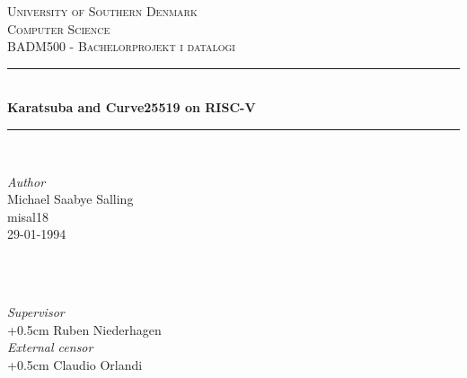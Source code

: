 \documentclass[12pt]{article}
\begin{document}
\setlength{\baselineskip}{1.5\baselineskip} %

\begin{titlepage} %
	\newcommand{\HRule}{\rule{\linewidth}{0.5mm}} %
	
	\center %
	
	
	\textsc{\LARGE University of Southern Denmark}\\[1.5cm] %
	
	\textsc{\Large Computer Science}\\[0.5cm] %
	
	\textsc{\large BADM500 - Bachelorprojekt i datalogi}\\[0.5cm] %
	
	
	\HRule\\[0.7cm]
	
	{\huge\bfseries Karatsuba and Curve25519 on RISC-V }\\[0.3cm] %
	
	\HRule\\[1.5cm]
	
	\begin{minipage}[c]{0.5\textwidth}
		\begin{flushleft}
			\large
			\textit{Author}\\
			[5mm]
			{Michael Saabye Salling \\}
			{misal18}\\
			{29-01-1994}\\
			\textsc{\Large }\\
			\end{flushleft}
	\end{minipage}
	~
    \begin{minipage}{0.4\textwidth}
		\begin{flushright}
		\large
  		\kern1.0cm
  		 \raggedleft
  		\textit{Supervisor}\\
  		\kern+0.5cm
		Ruben Niederhagen\\
		\large
  		\kern-4.5cm
  		 \raggedleft
  		\textit{External censor}\\
  		\kern+0.5cm
		Claudio Orlandi\\
		\end{flushright}
	\end{minipage}\\
	[6cm]
	

\end{titlepage}
\end{document}

